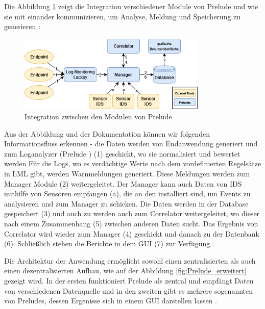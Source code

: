 Die Abbildung \ref{fig:Module_preludes} zeigt die Integration verschiedener Module von Prelude und wie sie mit einander kommunizieren, um Analyse, Meldung und Speicherung zu generieren \citep{Prelude_MU}:

\begin{figure}[H]
   \centering
   \includegraphics[width=0.8\textwidth]{assets/Prelude_Module.drawio.png}
   \caption[Integration zwischen den Modulen von Prelude ]
   {Integration zwischen den Modulen von Prelude }
   \label{fig:Module_preludes}
   \centering
\end{figure}


Aus der Abbildung und der Dokumentation können wir folgenden Informationsfluss erkennen - die Daten werden von Endanwendung generiert und zum Loganalyzer (Prelude ) (1) geschickt, wo sie normalisiert und bewertet werden Für die Logs, wo es verdächtige Werte nach dem vordefinierten Regelsätze in \gls{LML} gibt, werden Warnmeldungen generiert. Diese Meldungen werden zum Manager Module (2) weitergeleitet. Der Manager kann auch Daten von \gls{IDS} mithilfe von Sensoren empfangen (a), die an den  installiert sind, um Events zu analysieren und zum Manager zu schicken. Die Daten werden in der Database gespeichert (3) und auch zu werden auch zum Correlator weitergeleitet, wo dieser nach einem Zusammenhang (5) zwischen anderen Daten sucht. Das Ergebnis von Correlator wird wieder zum Manager (4) geschickt und danach zu der Datenbank (6). Schließlich stehen die Berichte in dem \gls{GUI} (7) zur Verfügung \citep{Prelude_Doc}.

Die Architektur der Anwendung ermöglicht sowohl einen zentralisierten als auch einen dezentralisierten Aufbau, wie auf der Abbildung \ref{fig:Prelude_erweitert} gezeigt wird. In der ersten funktioniert Prelude als zentral und empfängt Daten von verschiedenen Datenquelle und in den zweiten gibt es mehrere sogenannten  von Preludes, dessen Ergenisse sich in einem \gls{GUI} darstellen lassen \citep{Prelude_MU}.

